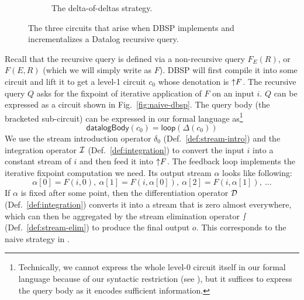 \begin{figure}[ht]
\begin{subfigure}[b]{0.35\textwidth}
        \caption{The delta-of-deltas strategy.}
        \label{fig:delta-of-deltas-dbsp}
    \end{subfigure}
    \caption{The three circuits that arise when DBSP implements and incrementalizes a Datalog recursive query.}
    \label{fig:three-approaches-DBSP}
\end{figure}

Recall that the recursive query is defined via a non-recursive query $F_E(R)$, or $F(E, R)$ (which we will simply write as $F$). DBSP will first compile it into some circuit and lift it to get a level-1 circuit $c_0$  whose denotation is ${\uparrow}F$.
The recursive query $Q$ asks for the fixpoint of iterative application of $F$ on an input $i$. $Q$ can be expressed as a circuit shown in Fig.~\ref{fig:naive-dbsp}. 
The query body (the bracketed sub-circuit) can be expressed in our formal language as\footnote{
    Technically, we cannot express the whole level-0 circuit itself in our formal language because of our syntactic restriction (see ), but it suffices to express the query body as it encodes sufficient information.
}
\begin{equation}\label{eq:naive-body}
    \mathsf{datalogBody}(c_0) = \mathsf{loop}(\Delta(c_0))
\end{equation}
We use the stream introduction operator $\delta_0$ (Def.~\ref{def:stream-intro}) and the integration operator $\mathcal{I}$ (Def.~\ref{def:integration}) to convert the input $i$ into a constant stream of $i$ and then feed it into ${\uparrow}F$. The feedback loop implements the iterative fixpoint computation we need. Its output stream $\alpha$ looks like following:
\[ \alpha[0] = F(i, 0), \ \alpha[1] = F(i, \alpha[0]), \ \alpha[2] = F(i, \alpha[1]), \ \ldots \] 
If $\alpha$ is fixed after some point, then the differentiation operator $\mathcal{D}$ (Def.~\ref{def:integration}) converts it into a stream that is zero almost everywhere, which can then be aggregated by the stream elimination operator $\smallint$ (Def.~\ref{def:stream-elim}) to produce the final output $o$. This corresponds to the naive strategy in .

